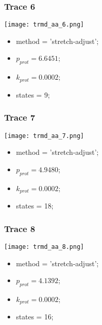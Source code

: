 \subsubsection{Trace 6}
\begin{minipage}[c]{0.7\textwidth}
    \texttt{[image: trmd\_aa\_6.png]}
\end{minipage}
\hfill
\begin{minipage}[c]{0.45\textwidth}
    \begin{itemize}
        \item method = 'stretch-adjust';
        \item $p_{prot}=6.6451$;
        \item $k_{prot}=0.0002$;
        \item states = 9;
    \end{itemize}
\end{minipage}

\subsubsection{Trace 7}
\begin{minipage}[c]{0.7\textwidth}
    \texttt{[image: trmd\_aa\_7.png]}
\end{minipage}
\hfill
\begin{minipage}[c]{0.45\textwidth}
    \begin{itemize}
        \item method = 'stretch-adjust';
        \item $p_{prot}=4.9480$;
        \item $k_{prot}=0.0002$;
        \item states = 18;
    \end{itemize}
\end{minipage}

\subsubsection{Trace 8}
\begin{minipage}[c]{0.7\textwidth}
    \texttt{[image: trmd\_aa\_8.png]}
\end{minipage}
\hfill
\begin{minipage}[c]{0.45\textwidth}
    \begin{itemize}
        \item method = 'stretch-adjust';
        \item $p_{prot}=4.1392$;
        \item $k_{prot}=0.0002$;
        \item states = 16;
    \end{itemize}
\end{minipage}

